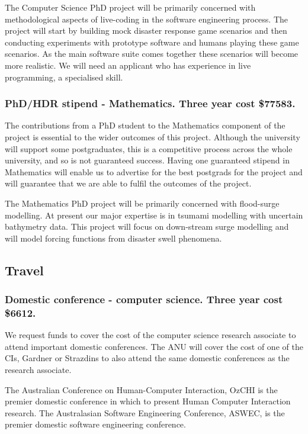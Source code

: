 \documentclass[a4paper,fontsize=12pt]{scrartcl}
\begin{document}
The Computer Science PhD project will be primarily concerned with methodological aspects of live-coding in the software engineering process. The project will start by building mock disaster response game scenarios and then conducting experiments with prototype software and humans playing these game scenarios. As the main software suite comes together these scenarios will become more realistic. We will need an applicant who has experience in live programming, a specialised skill. 

\subsubsection*{PhD/HDR stipend - Mathematics. Three year cost \$77583.}

The contributions from a PhD student to the Mathematics component of the project is essential to the wider outcomes of this project.
Although the university will support some postgraduates, this is a competitive
process across the whole university, and so is not guaranteed success. Having one guaranteed stipend in Mathematics will enable us to advertise for the best postgrads for the project and will guarantee that we are able to fulfil the outcomes of the project. 

The Mathematics PhD project will be primarily concerned with flood-surge modelling. At present our major expertise is in tsumami modelling with uncertain bathymetry data. This project will focus on down-stream surge modelling and will model forcing functions from disaster swell phenomena. 

\subsection*{Travel}

\subsubsection*{Domestic conference - computer science. Three year cost \$6612.}

We request funds to cover the cost of the computer science research associate to attend important domestic conferences.  The ANU will cover the cost of one of the CIs, Gardner or Strazdins to also attend the same domestic conferences as the research associate. 

The Australian Conference on Human-Computer Interaction, OzCHI is the premier domestic conference in which to present Human Computer Interaction research. 
The Australasian Software Engineering Conference, ASWEC, is the premier domestic software engineering conference.
\end{document}
